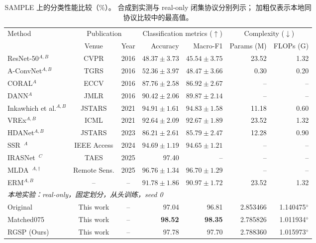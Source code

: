 \begin{table}[!t]
\centering
\small
\setlength{\tabcolsep}{4pt}
\renewcommand{\arraystretch}{1.10}
\caption{SAMPLE 上的分类性能比较（\%）。
合成到实测与 real-only 闭集协议分别列示；
加粗仅表示本地同协议比较中的最高值。}
\label{tab:sample_performance}
\begin{tabular*}{\textwidth}{@{\extracolsep{\fill}}lccrrrr}
\toprule
\multirow{2}{*}{Method}
& \multicolumn{2}{c}{Publication}
& \multicolumn{2}{c}{Classification metrics ($\uparrow$)}
& \multicolumn{2}{c}{Complexity ($\downarrow$)} \\
\cmidrule(lr){2-3}
\cmidrule(lr){4-5}
\cmidrule(lr){6-7}
& Venue & Year
& Accuracy & Macro-F1
& Params (M) & FLOPs (G) \\
\midrule
ResNet-50$^{A,B}$
& CVPR & 2016
& $48.37\pm3.73$ & $45.54\pm3.75$
& 23.52 & 1.32 \\
A-ConvNet$^{A,B}$
& TGRS & 2016
& $52.36\pm3.97$ & $48.47\pm3.66$
& 0.30 & 0.20 \\
CORAL$^{A}$
& ECCV & 2016
& $87.76\pm2.58$ & $86.92\pm2.67$
& -- & -- \\
DANN$^{A}$
& JMLR & 2016
& $90.42\pm2.06$ & $89.87\pm2.14$
& -- & -- \\
Inkawhich et al.$^{A,B}$
& JSTARS & 2021
& $94.91\pm1.61$ & $94.83\pm1.58$
& 11.18 & 0.60 \\
VREx$^{A,B}$
& ICML & 2021
& $92.64\pm2.09$ & $92.67\pm1.89$
& 23.52 & 1.32 \\
HDANet$^{A,B}$
& JSTARS & 2023
& $86.21\pm2.61$ & $85.79\pm2.47$
& 12.28 & 0.90 \\
SSR~\cite{ssr2024}$^{A}$
& IEEE Access & 2024
& $94.69\pm1.19$ & $94.65\pm1.21$
& -- & -- \\
IRASNet~\cite{irasnet2025}$^{C}$
& TAES & 2025
& 97.40 & --
& -- & -- \\
MLDA~\cite{mlda2025}$^{A,\dagger}$
& Remote Sens. & 2025
& $96.76\pm1.34$ & $96.70\pm1.29$
& -- & -- \\
ERM$^{A,B}$
& -- & --
& $91.78\pm1.86$ & $90.97\pm1.72$
& 23.52 & 1.32 \\
\midrule
\multicolumn{7}{l}{
\textit{本地实验：real-only，固定划分，从头训练，seed 0}} \\
Original
& This work & --
& 97.04 & 96.81 & 2.853466 & 1.140475$^{\diamond}$ \\
Matched075
& This work & --
& \textbf{98.52} & \textbf{98.35} & 2.785826 & 1.011934$^{\diamond}$ \\
RGSP (Ours)
& This work & --
& 97.78 & 97.70 & 2.788360 & 1.015973$^{\diamond}$ \\

\end{tabular*}
\end{table}
